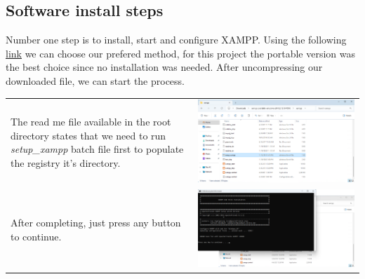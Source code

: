 \documentclass[11pt,a4paper]{report}
\begin{document}
    \subsection{Software install steps}
        Number one step is to install, start and configure XAMPP. Using the following \href{https://www.apachefriends.org/download.html}{link} we can choose our prefered method, for this project the portable version was the best choice since no installation was needed.
        After uncompressing our downloaded file, we can start the process.
        \begin{tabular}{ l r }
            The read me file available in the root directory states that
            we need to run \textit{setup\_xampp} batch file first to populate the
            registry it's directory.                                        & \includegraphics[scale=0.3]{install_xampp08} \\ %

            After completing, just press any button to continue.            & \includegraphics[scale=0.3]{install_xampp09} \\


\end{tabular}
\end{document}
